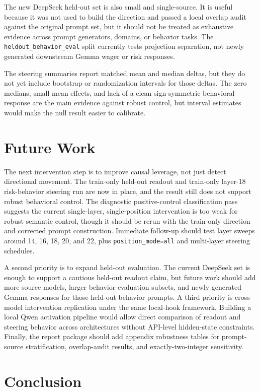 \documentclass[final]{sparreport}
\begin{document}
The new DeepSeek held-out set is also small and single-source. It is useful because it was not used to build the direction and passed a local overlap audit against the original prompt set, but it should not be treated as exhaustive evidence across prompt generators, domains, or behavior tasks. The \texttt{heldout\_behavior\_eval} split currently tests projection separation, not newly generated downstream Gemma wager or risk responses.

The steering summaries report matched mean and median deltas, but they do not yet include bootstrap or randomization intervals for those deltas. The zero medians, small mean effects, and lack of a clean sign-symmetric behavioral response are the main evidence against robust control, but interval estimates would make the null result easier to calibrate.

\section{Future Work}

The next intervention step is to improve causal leverage, not just detect directional movement. The train-only held-out readout and train-only layer-18 risk-behavior steering run are now in place, and the result still does not support robust behavioral control. The diagnostic positive-control classification pass suggests the current single-layer, single-position intervention is too weak for robust semantic control, though it should be rerun with the train-only direction and corrected prompt construction. Immediate follow-up should test layer sweeps around 14, 16, 18, 20, and 22, plus \texttt{position\_mode=all} and multi-layer steering schedules.

A second priority is to expand held-out evaluation. The current DeepSeek set is enough to support a cautious held-out readout claim, but future work should add more source models, larger behavior-evaluation subsets, and newly generated Gemma responses for those held-out behavior prompts. A third priority is cross-model intervention replication under the same local-hook framework. Building a local Qwen activation pipeline would allow direct comparison of readout and steering behavior across architectures without API-level hidden-state constraints. Finally, the report package should add appendix robustness tables for prompt-source stratification, overlap-audit results, and exactly-two-integer sensitivity.

\section{Conclusion}
\end{document}
